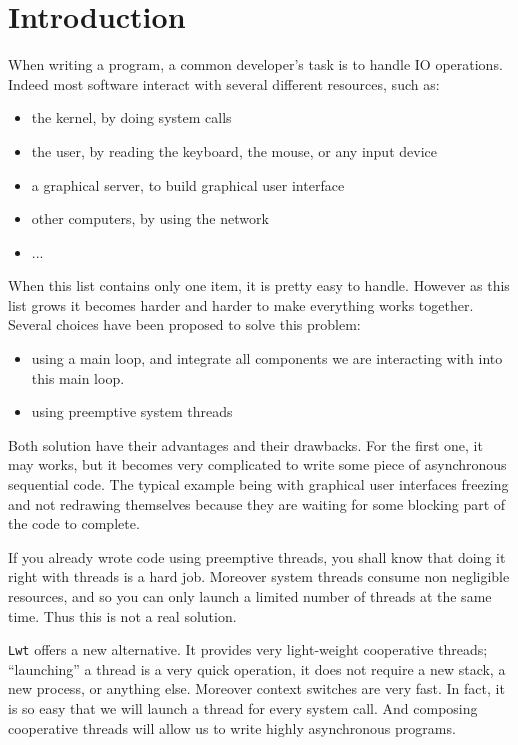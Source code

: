 
\section{ Introduction }

When writing a program, a common developer's task is to handle IO
operations. Indeed most software interact with several different
resources, such as:



\begin{itemize}
\item  the kernel, by doing system calls
\item  the user, by reading the keyboard, the mouse, or any input device
\item  a graphical server, to build graphical user interface
\item  other computers, by using the network
\item  ...

\end{itemize}

When this list contains only one item, it is pretty easy to
handle. However as this list grows it becomes harder and harder to
make everything works together. Several choices have been proposed
to solve this problem:



\begin{itemize}
\item  using a main loop, and integrate all components we are
interacting with into this main loop.
\item  using preemptive system threads

\end{itemize}

Both solution have their advantages and their drawbacks. For the
first one, it may works, but it becomes very complicated to write
some piece of asynchronous sequential code. The typical example being with
graphical user interfaces freezing and not redrawing themselves
because they are waiting for some blocking part of the code to
complete.



If you already wrote code using preemptive threads, you shall know
that doing it right with threads is a hard job. Moreover system
threads consume non negligible resources, and so you can only launch
a limited number of threads at the same time. Thus this is not a
real solution.



{\tt Lwt} offers a new alternative. It provides very light-weight
cooperative threads; ``launching'' a thread is a very quick
operation, it does not require a new stack, a new process, or
anything else. Moreover context switches are very fast. In fact, it
is so easy that we will launch a thread for every system call. And
composing cooperative threads will allow us to write highly
asynchronous programs.



